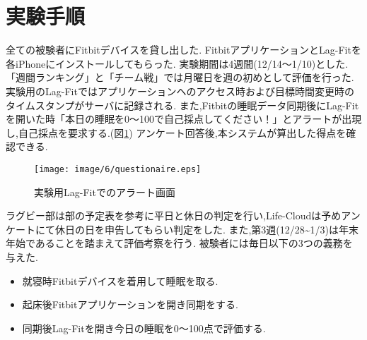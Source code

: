 \begin{table}[htbp]
	\begin{center}
 	\end{center}
 	\caption{被験者のデータ}
 	\label{user}
\end{table}

\section{実験手順}
全ての被験者にFitbitデバイスを貸し出した.
FitbitアプリケーションとLag-Fitを各iPhoneにインストールしてもらった.
実験期間は4週間(12/14〜1/10)とした.
「週間ランキング」と「チーム戦」では月曜日を週の初めとして評価を行った.
実験用のLag-Fitではアプリケーションヘのアクセス時および目標時間変更時のタイムスタンプがサーバに記録される.
また,Fitbitの睡眠データ同期後にLag-Fitを開いた時「本日の睡眠を0〜100で自己採点してください！」とアラートが出現し,自己採点を要求する.(図\ref{alertquestionaire})
アンケート回答後,本システムが算出した得点を確認できる.

\begin{figure}[tbp]
	\begin{center}
		\texttt{[image: image/6/questionaire.eps]}
		\caption{実験用Lag-Fitでのアラート画面}
		\label{alertquestionaire}
	\end{center}
\end{figure}

ラグビー部は部の予定表を参考に平日と休日の判定を行い,Life-Cloudは予めアンケートにて休日の日を申告してもらい判定をした.
また,第3週(12/28\textasciitilde1/3)は年末年始であることを踏まえて評価考察を行う.
被験者には毎日以下の3つの義務を与えた.
\begin{itemize}
	\item 就寝時Fitbitデバイスを着用して睡眠を取る.
 	\item 起床後Fitbitアプリケーションを開き同期をする.
	\item 同期後Lag-Fitを開き今日の睡眠を0〜100点で評価する.
\end{itemize}

